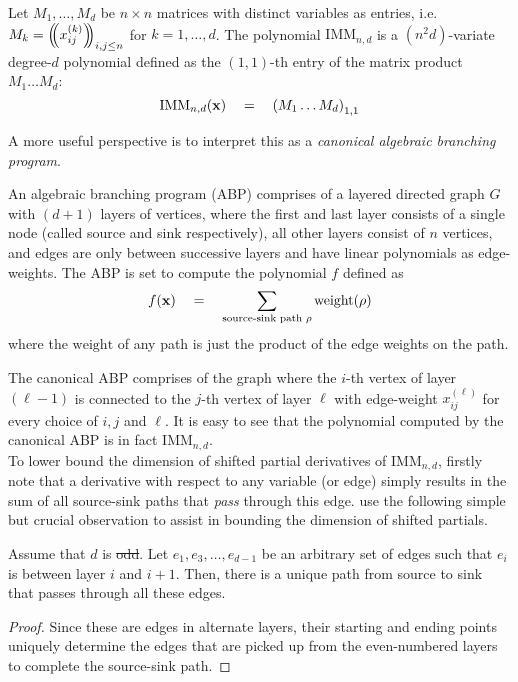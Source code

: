 \documentclass{birkjour}
\newcommand{\spaced}[1]{\quad#1\quad}
\providecommand{\DIFaddtex}[1]{{\protect\color{blue}\uwave{#1}}} %
\providecommand{\DIFdeltex}[1]{{\protect\color{red}\sout{#1}}}                      %
\providecommand{\DIFaddbegin}{} %
\providecommand{\DIFaddend}{} %
\providecommand{\DIFdelbegin}{} %
\providecommand{\DIFdelend}{} %
\providecommand{\DIFadd}[1]{\texorpdfstring{\DIFaddtex{#1}}{#1}} %
\providecommand{\DIFdel}[1]{\texorpdfstring{\DIFdeltex{#1}}{}} %
\begin{document}
\begin{definition}
Let $M_1,\dots, M_d$ be $n\times n$ matrices with distinct variables as entries, i.e. $M_k = \left(\!\!\left(x_{ij}^{(k)}\right)\!\!\right)_{i,j\leq n}$ for $k = 1,\dots, d$. The polynomial $\mathrm{IMM}_{n,d}$ is a $(n^2d)$-variate degree-$d$ polynomial defined as the $(1,1)$-th entry of the matrix product $M_1\dots M_d$:
$$
\mathrm{IMM}_{n,d}(\vecx) \spaced{=} \inparen{M_1 \dots M_d}_{1,1}
$$
\end{definition}

A more useful perspective is to interpret this as a \emph{canonical algebraic branching program}. 

\begin{definition}
An algebraic branching program (ABP) comprises of a layered directed graph $G$ with $(d+1)$ layers of vertices, where the first and last layer consists of a single node (called source and sink respectively), all other layers consist of $n$ vertices, and edges are only between successive layers and have linear polynomials as edge-weights. The ABP is set to compute the polynomial $f$ defined as
$$
f(\vecx) \spaced{=} \sum_{\text{source-sink path $\rho$}} \mathrm{weight}(\rho)
$$
where the $\mathrm{weight}$ of any path is just the product of the edge weights on the path. 
\end{definition}

The canonical ABP comprises of the graph where the $i$-th vertex of layer $(\ell-1)$ is connected to the $j$-th vertex of layer $\ell$ with edge-weight $x_{ij}^{(\ell)}$ for every choice of $i,j$ and $\ell$. It is easy to see that the polynomial computed by the canonical ABP is in fact $\mathrm{IMM}_{n,d}$. \\

To lower bound the dimension of shifted partial derivatives of $\mathrm{IMM}_{n,d}$, firstly note that a derivative with respect to any variable (or edge) simply results in the sum of all source-sink paths that \emph{pass} through this edge. \cite{FLMS13} use the following simple but crucial observation to assist in bounding the dimension of shifted partials. 

\begin{observation}\label{obs:odd-layer-unique-path}
Assume that $d$ is \DIFdelbegin \DIFdel{odd}\DIFdelend \DIFaddbegin \DIFadd{even}\DIFaddend . Let $e_1,e_3,\dots, e_{d-1}$ be an arbitrary set of edges such that $e_i$ is between layer $i$ and $i+1$. Then, there is a unique path from source to sink that passes through all these edges. 
\end{observation}
\begin{proof}
Since these are edges in alternate layers, their starting and ending points uniquely determine the edges that are picked up from the even-numbered layers to complete the source-sink path.
\end{proof}
\end{document}
